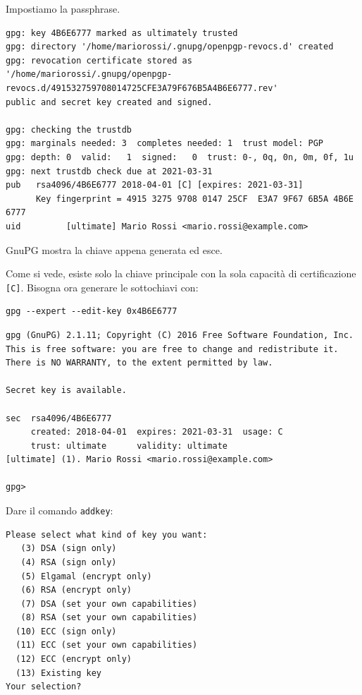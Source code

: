 \documentclass[a4paper,10pt]{article}
\begin{document}
Impostiamo la passphrase.

\begin{lstlisting}
gpg: key 4B6E6777 marked as ultimately trusted
gpg: directory '/home/mariorossi/.gnupg/openpgp-revocs.d' created
gpg: revocation certificate stored as '/home/mariorossi/.gnupg/openpgp-revocs.d/491532759708014725CFE3A79F676B5A4B6E6777.rev'
public and secret key created and signed.

gpg: checking the trustdb
gpg: marginals needed: 3  completes needed: 1  trust model: PGP
gpg: depth: 0  valid:   1  signed:   0  trust: 0-, 0q, 0n, 0m, 0f, 1u
gpg: next trustdb check due at 2021-03-31
pub   rsa4096/4B6E6777 2018-04-01 [C] [expires: 2021-03-31]
      Key fingerprint = 4915 3275 9708 0147 25CF  E3A7 9F67 6B5A 4B6E 6777
uid         [ultimate] Mario Rossi <mario.rossi@example.com>
\end{lstlisting}

GnuPG mostra la chiave appena generata ed esce.

Come si vede, esiste solo la chiave principale con la sola capacità di certificazione \texttt{[C]}.
Bisogna ora generare le sottochiavi con:

\begin{lstlisting}
gpg --expert --edit-key 0x4B6E6777
\end{lstlisting}


\begin{lstlisting}
gpg (GnuPG) 2.1.11; Copyright (C) 2016 Free Software Foundation, Inc.
This is free software: you are free to change and redistribute it.
There is NO WARRANTY, to the extent permitted by law.

Secret key is available.

sec  rsa4096/4B6E6777
     created: 2018-04-01  expires: 2021-03-31  usage: C
     trust: ultimate      validity: ultimate
[ultimate] (1). Mario Rossi <mario.rossi@example.com>

gpg>
\end{lstlisting}

Dare il comando \texttt{addkey}:

\begin{lstlisting}
Please select what kind of key you want:
   (3) DSA (sign only)
   (4) RSA (sign only)
   (5) Elgamal (encrypt only)
   (6) RSA (encrypt only)
   (7) DSA (set your own capabilities)
   (8) RSA (set your own capabilities)
  (10) ECC (sign only)
  (11) ECC (set your own capabilities)
  (12) ECC (encrypt only)
  (13) Existing key
Your selection?
\end{lstlisting}
\end{document}
